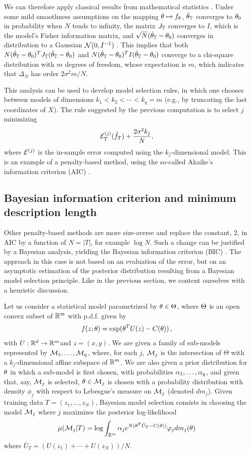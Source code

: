 We can therefore apply classical  results from mathematical statistics \citep{van2000asymptotic}. Under some mild smoothness assumptions on the mapping $\theta \mapsto f_{\theta}$,  ${\hat{\theta}}_{\mathbb T}$ converges to $\theta_0$ in probability when $N$ tends to infinity, the matrix $J_{\mathbb T}$ converges to $I$, which is the model's Fisher information matrix, and $\sqrt N ({\hat{\theta}}_{\mathbb T} - \theta_0)$ converges in distribution to a Gaussian ${\mathcal N}(0, I^{-1})$ . This implies that both $N({\hat{\theta}}_{\mathbb T} - \theta_0)^T J_{{\mathbb T}} ({\hat{\theta}}_{\mathbb T} - \theta_0)$ and $N({\hat{\theta}}_{\mathbb T} - \theta_0)^T I  ({\hat{\theta}}_{\mathbb T} - \theta_0)$ converge to a chi-square distribution with $m$ degrees of freedom, whose expectation is $m$, which indicates that $\Delta_N$ has order $2\sigma^2m/N$.


This analysis can be used to develop model selection rules, in which one chooses between models of dimensions $k_1 <k_2 < \cdots < k_q = m$ (e.g., by truncating the last coordinates of $X$).  The rule suggested by the previous computation is to  select $j$ minimizing  
\[
{\mathcal E}^{(j)}_T({\hat{f}}_T) + \frac{2\sigma^2 k_j}N,
\]
  where ${\mathcal E}^{(j)}$ is the in-sample error computed using the $k_j$-dimensional model.
This is an example of a penalty-based method, using the so-called Akaike's
information criterion (AIC) \citep{akaike1973information}. 


\subsection{Bayesian information criterion and minimum description length}
Other penalty-based methods are more size-averse and replace  the
constant, $2$, in AIC by  a function of $N = |T|$, for example
$\log N$. Such a change can be justified by a Bayesian
analysis, yielding the Bayesian information criterion (BIC) \citep{schwarz1978estimating}. The approach in this case is not based on an evaluation of the error, but on an asymptotic estimation of the posterior distribution resulting from a Bayesian model selection principle.  Like in the previous section, we content ourselves with a heuristic discussion.


Let us consider a statistical model parametrized by $\theta\in \Theta$, where $\Theta$ is an open convex subset of ${\mathbb{R}}^m$ with p.d.f. given by
\[
f(z;\theta) = \exp(\theta^TU(z) - C(\theta))\,,
\]
with $U: {\mathbb{R}}^d \to {\mathbb{R}}^m$and $z = (x,y)$. We are given a family of sub-models represented by ${\mathcal M}_1, \ldots, {\mathcal M}_q$, where, for each $j$, ${\mathcal M}_j$ is the intersection of $\Theta$ with a $k_j$-dimensional affine subspace of ${\mathbb{R}}^m$. We are also given a prior distribution for $\theta$ in which a sub-model is first chosen, with probabilities $\alpha_1, \ldots, \alpha_q$, and given that, say, ${\mathcal M}_j$ is selected, $\theta\in {\mathcal M}_j$ is chosen with a probability distribution with density $\phi_j$ with respect to Lebesgue's measure on ${\mathcal M}_j$ (denoted $dm_j$). Given training data $T = (z_1, \ldots, z_N)$, Bayesian model selection consists in choosing the model ${\mathcal M}_j$ where $j$ maximizes the posterior log-likelihood
\[
\mu({\mathcal M}_j|T) = \log\int_{{\mathbb{R}}^m} \alpha_j e^{N(\theta^T \bar U_T - C(\theta))} \varphi_j dm_j(\theta)
\]
where $\bar U_T = (U(z_1) + \cdots + U(z_N))/N$. 

